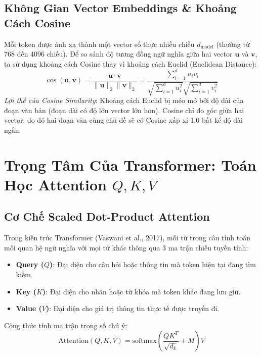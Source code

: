 \subsection{Không Gian Vector Embeddings \& Khoảng Cách Cosine}
Mỗi token được ánh xạ thành một vector số thực nhiều chiều $d_{\text{model}}$ (thường từ 768 đến 4096 chiều). Để so sánh độ tương đồng ngữ nghĩa giữa hai vector $\mathbf{u}$ và $\mathbf{v}$, ta sử dụng khoảng cách Cosine thay vì khoảng cách Euclid (Euclidean Distance):
\begin{equation}
\cos(\mathbf{u}, \mathbf{v}) = \frac{\mathbf{u} \cdot \mathbf{v}}{\|\mathbf{u}\|_2 \|\mathbf{v}\|_2} = \frac{\sum_{i=1}^d u_i v_i}{\sqrt{\sum_{i=1}^d u_i^2} \sqrt{\sum_{i=1}^d v_i^2}}
\end{equation}
\textit{Lợi thế của Cosine Similarity}: Khoảng cách Euclid bị méo mó bởi độ dài của đoạn văn bản (đoạn dài có độ lớn vector lớn hơn). Cosine chỉ đo góc giữa hai vector, do đó hai đoạn văn cùng chủ đề sẽ có Cosine xấp xỉ 1.0 bất kể độ dài ngắn.

\section{Trọng Tâm Của Transformer: Toán Học Attention $Q, K, V$}

\subsection{Cơ Chế Scaled Dot-Product Attention}
Trong kiến trúc Transformer (Vaswani et al., 2017), mỗi từ trong câu tính toán mối quan hệ ngữ nghĩa với mọi từ khác thông qua 3 ma trận chiếu tuyến tính:
\begin{itemize}
    \item \textbf{Query ($Q$)}: Đại diện cho câu hỏi hoặc thông tin mà token hiện tại đang tìm kiếm.
    \item \textbf{Key ($K$)}: Đại diện cho nhãn hoặc từ khóa mà token khác đang lưu giữ.
    \item \textbf{Value ($V$)}: Đại diện cho giá trị thông tin thực tế được truyền đi.
\end{itemize}

Công thức tính ma trận trọng số chú ý:
\begin{equation}
\text{Attention}(Q, K, V) = \text{softmax}\left(\frac{Q K^T}{\sqrt{d_k}} + M\right) V
\end{equation}

